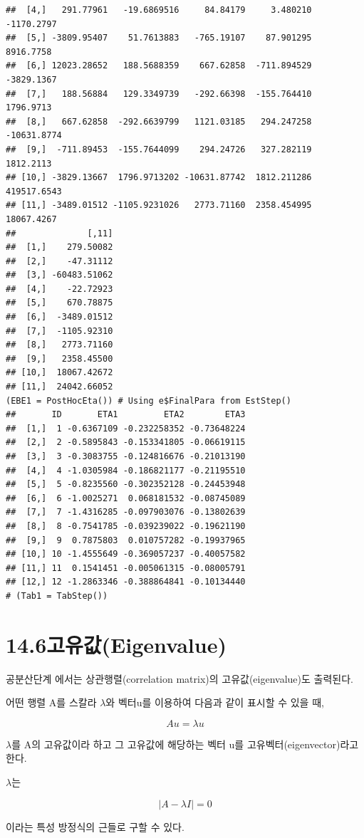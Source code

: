 \documentclass[
  10pt,
]{krantz}
\begin{document}
\begin{verbatim}
##  [4,]   291.77961   -19.6869516     84.84179     3.480210  -1170.2797
##  [5,] -3809.95407    51.7613883   -765.19107    87.901295   8916.7758
##  [6,] 12023.28652   188.5688359    667.62858  -711.894529  -3829.1367
##  [7,]   188.56884   129.3349739   -292.66398  -155.764410   1796.9713
##  [8,]   667.62858  -292.6639799   1121.03185   294.247258 -10631.8774
##  [9,]  -711.89453  -155.7644099    294.24726   327.282119   1812.2113
## [10,] -3829.13667  1796.9713202 -10631.87742  1812.211286 419517.6543
## [11,] -3489.01512 -1105.9231026   2773.71160  2358.454995  18067.4267
##              [,11]
##  [1,]    279.50082
##  [2,]    -47.31112
##  [3,] -60483.51062
##  [4,]    -22.72923
##  [5,]    670.78875
##  [6,]  -3489.01512
##  [7,]  -1105.92310
##  [8,]   2773.71160
##  [9,]   2358.45500
## [10,]  18067.42672
## [11,]  24042.66052
(EBE1 = PostHocEta()) # Using e$FinalPara from EstStep()
##       ID       ETA1         ETA2        ETA3
##  [1,]  1 -0.6367109 -0.232258352 -0.73648224
##  [2,]  2 -0.5895843 -0.153341805 -0.06619115
##  [3,]  3 -0.3083755 -0.124816676 -0.21013190
##  [4,]  4 -1.0305984 -0.186821177 -0.21195510
##  [5,]  5 -0.8235560 -0.302352128 -0.24453948
##  [6,]  6 -1.0025271  0.068181532 -0.08745089
##  [7,]  7 -1.4316285 -0.097903076 -0.13802639
##  [8,]  8 -0.7541785 -0.039239022 -0.19621190
##  [9,]  9  0.7875803  0.010757282 -0.19937965
## [10,] 10 -1.4555649 -0.369057237 -0.40057582
## [11,] 11  0.1541451 -0.005061315 -0.08005791
## [12,] 12 -1.2863346 -0.388864841 -0.10134440
# (Tab1 = TabStep())
\end{verbatim}

\hypertarget{uxace0uxc720uxac12eigenvalue}{%
\section{14.6고유값(Eigenvalue)}\label{uxace0uxc720uxac12eigenvalue}}

공분산단계 에서는 상관행렬(correlation matrix)의 고유값(eigenvalue)도 출력된다.

어떤 행렬 A를 스칼라 \(\lambda\)와 벡터u를 이용하여 다음과 같이 표시할 수 있을 때,

\[Au = \lambda u\]

\(\lambda\)를 A의 고유값이라 하고 그 고유값에 해당하는 벡터 u를 고유벡터(eigenvector)라고 한다.

\(\lambda\)는

\[\left| A - \lambda I \right| = 0\]

이라는 특성 방정식의 근들로 구할 수 있다.
\end{document}
